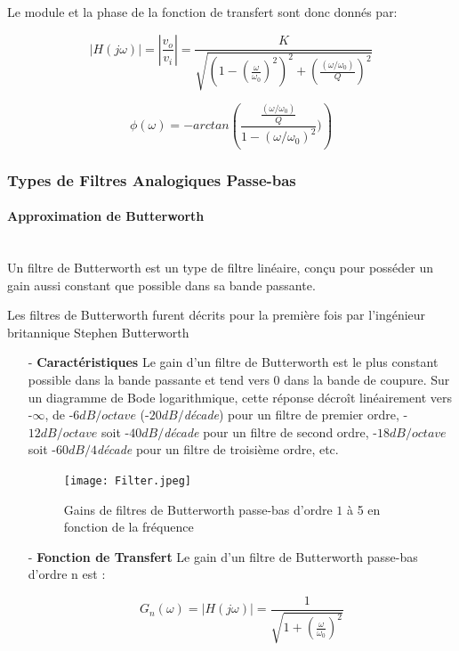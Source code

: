 \documentclass[conference,onecolumn]{IEEEtran}
\begin{document}
Le module et la phase de la fonction de transfert sont donc donnés par:

\begin{equation}
    |H(j\omega)| = |\frac{v_o}{v_i}| = \frac{K}{\sqrt{(1 - (\frac{\omega}{\omega_0})^2)^2 + (\frac{(\omega/\omega_0)}{Q})^2}}
\end{equation}

\begin{equation}
    \phi(\omega) = -arctan\left(\frac{\frac{(\omega/\omega_0)}{Q}}{1 - (\omega/\omega_0)^2})\right)
\end{equation}

\subsubsection{Types de Filtres Analogiques Passe-bas}
\paragraph{Approximation de Butterworth}
\hfill \\
Un filtre de Butterworth est un type de filtre linéaire, conçu pour posséder un gain aussi constant que possible dans sa bande passante.

Les filtres de Butterworth furent décrits pour la première fois par l'ingénieur britannique Stephen Butterworth

\begin{itemize}
  \item[-] \textbf{Caractéristiques}
  Le gain d'un filtre de Butterworth est le plus constant possible dans la bande passante et tend vers 0 dans la bande de coupure. Sur un diagramme de Bode logarithmique, cette réponse décroît linéairement vers -$\infty$, de -$6dB/octave$ (-$20 dB/$\textit{décade}) pour un filtre de premier ordre, -$12dB/octave$ soit -$40dB/$\textit{décade} pour un filtre de second ordre, -$18dB/octave$ soit -$60dB/4$\textit{décade} pour un filtre de troisième ordre, etc.
  
  \begin{figure}[H]
 \centering
    \texttt{[image: Filter.jpeg]}
    \caption{Gains de filtres de Butterworth passe-bas d'ordre $1$ à 5 en fonction de la fréquence}
\end{figure}
  
  \item[-] \textbf{Fonction de Transfert}
  Le gain d'un filtre de Butterworth passe-bas d'ordre n est :
  
  \begin{equation}
      G_n(\omega) = |H(j\omega)| = \frac{1}{\sqrt{1 + (\frac{\omega}{\omega_0})^2}}
  \end{equation}

\end{itemize}
\end{document}
